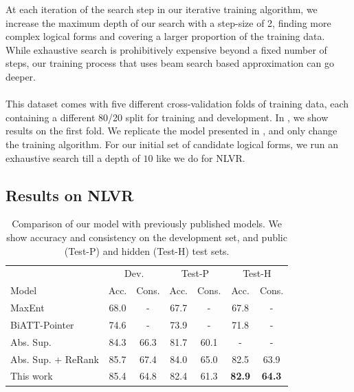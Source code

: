 At each iteration of the search step in our iterative training algorithm, we
increase the maximum depth of our search with a step-size of 2, finding more
complex logical forms and covering a larger proportion of the training data.
While exhaustive search is prohibitively expensive beyond a fixed number of
steps, our training process that uses beam search based approximation can go
deeper.

\paragraph{\WTQ} This dataset comes with five different cross-validation folds
of training data, each containing a different 80/20 split for training and
development. In , we show results on the first
fold. We replicate the model presented in \citet{krishnamurthy2017neural}, and
only change the training algorithm. For our initial set of candidate logical
forms, we run an exhaustive search till a depth of $10$ like we do for NLVR.


\subsection{Results on NLVR}
\begin{table}
	\centering
	\begin{tabular}{lcccccc}
	\toprule
	\multicolumn{1}{c}{} & \multicolumn{2}{c}{Dev.} & \multicolumn{2}{c}{Test-P} & \multicolumn{2}{c}{Test-H} \\
	Model & Acc. & Cons. & Acc. & Cons. & Acc. & Cons.\\
	\midrule
	MaxEnt \citep{suhr2017corpus} & 68.0 & - & 67.7 & - & 67.8 & - \\
	BiATT-Pointer \citep{tan2018object} & 74.6 & - & 73.9 & - & 71.8 & - \\
	Abs. Sup. \citep{goldman2017weakly} & 84.3 & 66.3 & 81.7 & 60.1 & - & - \\
	Abs. Sup. + ReRank \citep{goldman2017weakly} & 85.7 & 67.4 & 84.0 & 65.0 & 82.5 & 63.9 \\
	This work & 85.4 & 64.8 & 82.4 & 61.3 & \textbf{82.9} & \textbf{64.3} \\
	\bottomrule
	\end{tabular}
	\caption{Comparison of our model with previously published models. We show accuracy and consistency on the development set, and public (Test-P) and hidden (Test-H) test sets.}\label{tab:main_result}
\end{table}
